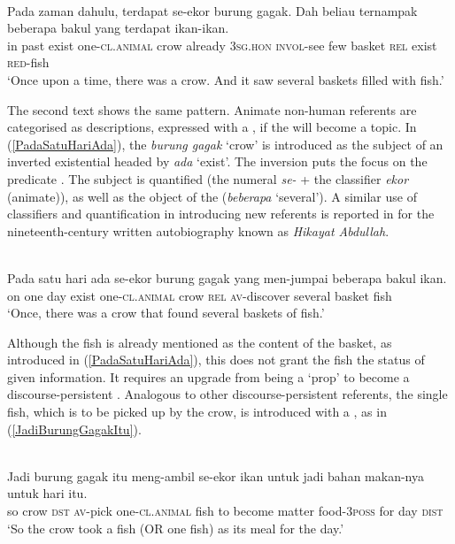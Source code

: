 \documentclass[output=paper
,modfonts
,nonflat]{langsci/langscibook}
\begin{document}
\ea\label{PadaZamanDulu} 
\\
	\gll  Pada {zaman dahulu}, terdapat  {\ob}se-ekor {burung gagak}{\cb}. Dah     beliau  ternampak beberapa bakul  yang terdapat ikan-ikan. \\
in past               exist    one-\textsc{cl.animal}   crow already \textsc{3sg.hon} \textsc{invol}-see       few      basket \textsc{rel}  exist    \textsc{red}-fish\\
\glt `Once upon a time, there was a crow. And it saw several baskets filled with fish.'
\z

\noindent
The second text shows the same pattern. Animate non-human referents are categorised as descriptions, expressed with a , if the  will become a topic. In (\ref{PadaSatuHariAda}), the   \emph{burung gagak} `crow' is introduced as the subject of an inverted existential  headed by \emph{ada} `exist'. The inversion puts the focus on the predicate \citep[270]{Sneddon2012}. The subject is quantified (the numeral \emph{se-} + the classifier \emph{ekor} (animate)), as well as the object of the  (\emph{beberapa} `several'). A similar use of classifiers and quantification in introducing new referents is reported in \cite[319]{Hopper1986} for the nineteenth-century written autobiography known as \emph{Hikayat Abdullah}.

\ea\label{PadaSatuHariAda} 
\\
	\gll 	Pada satu hari ada    {\ob}se-ekor {burung gagak}{\cb} yang men-jumpai beberapa bakul  ikan.\\
		on   one  day  exist one-\textsc{cl.animal} crow         \textsc{rel}  \textsc{av-}discover  several     basket fish\\
	\glt `Once, there was a crow that found several baskets of fish.'
\z

\noindent
Although the fish is already mentioned as the content of the basket, as introduced in (\ref{PadaSatuHariAda}), this does not grant the fish the status of given information. It requires an upgrade from being a `prop' to become a discourse-persistent  \citep[cf.][319]{Hopper1986}. Analogous to other discourse-persistent referents, the single fish, which is to be picked up by the crow, is introduced with a , as in  (\ref{JadiBurungGagakItu}). 

\ea\label{JadiBurungGagakItu} 
\\
\gll 	Jadi {burung gagak} itu meng-ambil  {\ob}se-ekor ikan{\cb} untuk jadi   bahan  makan-nya   untuk hari itu.\\
so   crow         \textsc{dst} \textsc{av-}pick      one-\textsc{cl.animal}   fish to    become matter food-\textsc{3poss} for   day \textsc{dist}\\
	\glt `So the crow took a fish (OR one fish) as its meal for the day.'
\z
\end{document}
